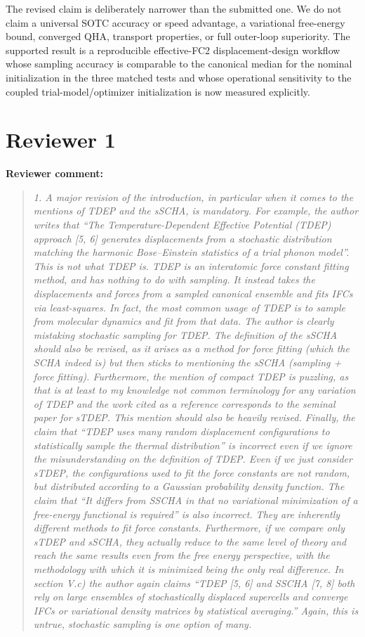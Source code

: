 \documentclass[11pt]{article}
\newcommand{\Question}[1]{\par\medskip\noindent\textbf{Reviewer comment:}\par\begin{quote}\itshape #1\end{quote}}
\begin{document}
The revised claim is deliberately narrower than the submitted one. We do not
claim a universal SOTC accuracy or speed advantage, a variational free-energy
bound, converged QHA, transport properties, or full outer-loop superiority.
The supported result is a reproducible effective-FC2 displacement-design
workflow whose sampling accuracy is comparable to the canonical median for the
nominal initialization in the three matched tests and whose operational
sensitivity to the coupled trial-model/optimizer initialization is now measured
explicitly.

\section*{Reviewer 1}

\Question{1. A major revision of the introduction, in particular when it comes to the mentions of TDEP and the sSCHA, is mandatory. For example, the author writes that \textquotedblleft{}The Temperature-Dependent Effective Potential (TDEP) approach [5, 6] generates displacements from a stochastic distribution matching the harmonic Bose--Einstein statistics of a trial phonon model''. This is not what TDEP is. TDEP is an interatomic force constant fitting method, and has nothing to do with sampling. It instead takes the displacements and forces from a sampled canonical ensemble and fits IFCs via least-squares. In fact, the most common usage of TDEP is to sample from molecular dynamics and fit from that data. The author is clearly mistaking stochastic sampling for TDEP. The definition of the sSCHA should also be revised, as it arises as a method for force fitting (which the SCHA indeed is) but then sticks to mentioning the sSCHA (sampling + force fitting). Furthermore, the mention of compact TDEP is puzzling, as that is at least to my knowledge not common terminology for any variation of TDEP and the work cited as a reference corresponds to the seminal paper for sTDEP. This mention should also be heavily revised. Finally, the claim that \textquotedblleft{}TDEP uses many random displacement configurations to statistically sample the thermal distribution'' is incorrect even if we ignore the misunderstanding on the definition of TDEP. Even if we just consider sTDEP, the configurations used to fit the force constants are not random, but distributed according to a Gaussian probability density function. The claim that \textquotedblleft{}It differs from SSCHA in that no variational minimization of a free-energy functional is required'' is also incorrect. They are inherently different methods to fit force constants. Furthermore, if we compare only sTDEP and sSCHA, they actually reduce to the same level of theory and reach the same results even from the free energy perspective, with the methodology with which it is minimized being the only real difference. In section V.c) the author again claims \textquotedblleft{}TDEP [5, 6] and SSCHA [7, 8] both rely on large ensembles of stochastically displaced supercells and converge IFCs or variational density matrices by statistical averaging.'' Again, this is untrue, stochastic sampling is one option of many.

}
\end{document}
